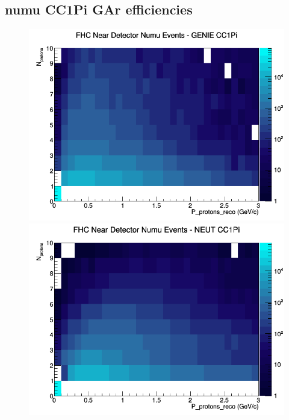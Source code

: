 \subsection{numu CC1Pi GAr efficiencies}
\begin{figure}[h]
\includegraphics[width=\linewidth]{eff_N_P/GAr/protons/CC1Pi_FHC_ND_numu_N_P_GENIE.png}
\endminipage
{}
\includegraphics[width=\linewidth]{eff_N_P/GAr/protons/CC1Pi_FHC_ND_numu_N_P_NEUT.png}
\endminipage
{}

\end{figure}
